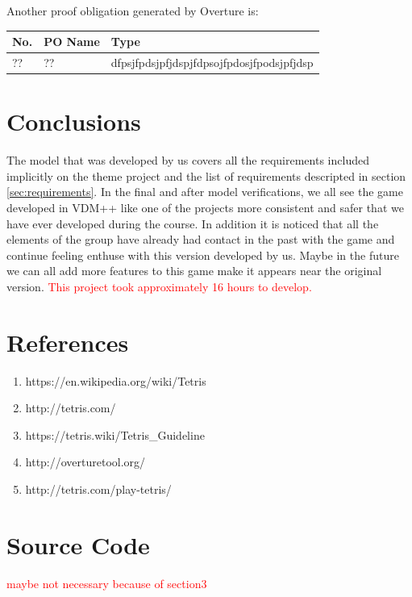 \documentclass[a4paper]{article}
\begin{document}
Another proof obligation generated by Overture is:

\begin{table}[!h]
	\centering
	\label{domain-verification}
	\begin{tabular}{|l|l|p{8.5cm}|}
		\hline
		No.  & PO Name & Type	\\	\hline
		??   & ?? & dfpsjfpdsjpfjdspjfdpsojfpdosjfpodsjpfjdsp	\\	\hline
	\end{tabular}
\end{table}

\section{Conclusions} 

The model that was developed by us covers all the requirements included implicitly on the theme project and the list of requirements descripted in section \ref{sec:requirements}.
In the final and after model verifications, we all see the game developed in VDM++ like one of the projects more consistent and safer that we have ever developed during the course. 
In addition it is noticed that all the elements of the group have already had contact in the past with the game and continue feeling enthuse with this version developed by us. Maybe in the future we can all add more features to this game make it appears near the original version.
\textcolor{red}{This project took approximately 16 hours to develop.}


\section{References}

\begin{enumerate}
	
\item https://en.wikipedia.org/wiki/Tetris
\item http://tetris.com/
\item https://tetris.wiki/Tetris\_Guideline
\item http://overturetool.org/
\item http://tetris.com/play-tetris/

\end{enumerate}

\newpage
\appendix
\section{Source Code}
\textcolor{red}{maybe not necessary because of section3}
\end{document}
